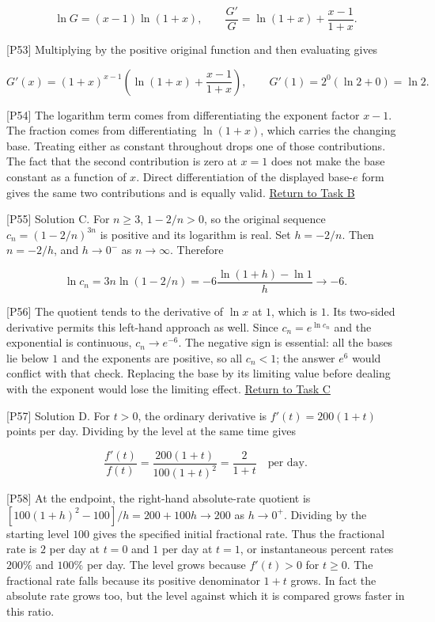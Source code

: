 \documentclass[
  11pt,
]{article}
\providecommand{\gt}{>}
\providecommand{\lt}{<}
\begin{document}
\[
\ln G=(x-1)\ln(1+x),
\qquad \frac{G'}G=\ln(1+x)+\frac{x-1}{1+x}.
\]

{[}P53{]} Multiplying by the positive original function and then
evaluating gives

\[
G'(x)=(1+x)^{x-1}\left(\ln(1+x)+\frac{x-1}{1+x}\right),
\qquad G'(1)=2^0(\ln2+0)=\ln2.
\]

{[}P54{]} The logarithm term comes from differentiating the exponent
factor \(x-1\). The fraction comes from differentiating \(\ln(1+x)\),
which carries the changing base. Treating either as constant throughout
drops one of those contributions. The fact that the second contribution
is zero at \(x=1\) does not make the base constant as a function of
\(x\). Direct differentiation of the displayed base-\(e\) form gives the
same two contributions and is equally valid.
\protect\hyperlink{task-b}{Return to Task B}

{[}P55{]} Solution C. For \(n\ge3\), \(1-2/n\gt0\), so the original
sequence \(c_n=(1-2/n)^{3n}\) is positive and its logarithm is real. Set
\(h=-2/n\). Then \(n=-2/h\), and \(h\to0^-\) as \(n\to\infty\).
Therefore

\[
\ln c_n=3n\ln(1-2/n)
=-6\frac{\ln(1+h)-\ln1}{h}\longrightarrow-6.
\]

{[}P56{]} The quotient tends to the derivative of \(\ln x\) at \(1\),
which is \(1\). Its two-sided derivative permits this left-hand approach
as well. Since \(c_n=e^{\ln c_n}\) and the exponential is continuous,
\(c_n\to e^{-6}\). The negative sign is essential: all the bases lie
below \(1\) and the exponents are positive, so all \(c_n\lt1\); the
answer \(e^6\) would conflict with that check. Replacing the base by its
limiting value before dealing with the exponent would lose the limiting
effect. \protect\hyperlink{task-c}{Return to Task C}

{[}P57{]} Solution D. For \(t\gt0\), the ordinary derivative is
\(f'(t)=200(1+t)\) points per day. Dividing by the level at the same
time gives

\[
\frac{f'(t)}{f(t)}=\frac{200(1+t)}{100(1+t)^2}
=\frac2{1+t}\quad\text{per day}.
\]

{[}P58{]} At the endpoint, the right-hand absolute-rate quotient is
\([100(1+h)^2-100]/h=200+100h\to200\) as \(h\to0^+\). Dividing by the
starting level \(100\) gives the specified initial fractional rate. Thus
the fractional rate is \(2\) per day at \(t=0\) and \(1\) per day at
\(t=1\), or instantaneous percent rates \(200\%\) and \(100\%\) per day.
The level grows because \(f'(t)\gt0\) for \(t\ge0\). The fractional rate
falls because its positive denominator \(1+t\) grows. In fact the
absolute rate grows too, but the level against which it is compared
grows faster in this ratio.
\end{document}
